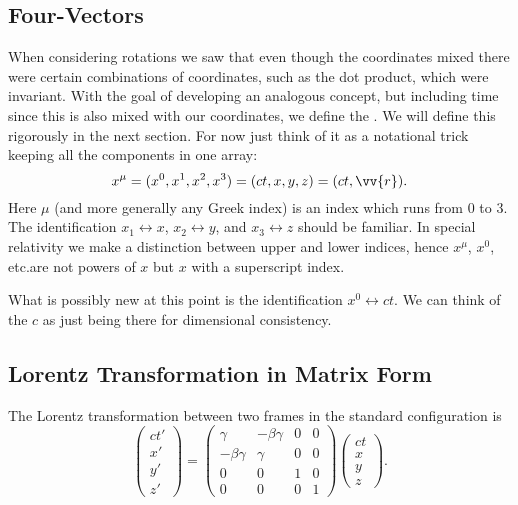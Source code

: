 \documentclass[fleqn]{NotesClass}
\begin{document}
    \subsection{Four-Vectors}
    When considering rotations we saw that even though the coordinates mixed there were certain combinations of coordinates, such as the dot product, which were invariant.
    With the goal of developing an analogous concept, but including time since this is also mixed with our coordinates, we define the .
    We will define this rigorously in the next section.
    For now just think of it as a notational trick keeping all the components in one array:
    \begin{equation}
        x^\mu = (x^0, x^1, x^2, x^3) = (ct, x, y, z) = (ct, \vv{r}).
    \end{equation}
    Here \(\mu\) (and more generally any Greek index) is an index which runs from \(0\) to \(3\).
    The identification \(x_1 \leftrightarrow x\), \(x_2 \leftrightarrow y\), and \(x_3 \leftrightarrow z\) should be familiar.
    In special relativity we make a distinction between upper and lower indices, hence \(x^\mu\), \(x^0\), etc.\@ are not powers of \(x\) but \(x\) with a superscript index.
    
    What is possibly new at this point is the identification \(x^0 \leftrightarrow ct\).
    We can think of the \(c\) as just being there for dimensional consistency.
    
    \subsection{Lorentz Transformation in Matrix Form}
    The Lorentz transformation between two frames in the standard configuration is
    \begin{equation}
        \begin{pmatrix}
            ct'\\ x'\\ y'\\ z'
        \end{pmatrix}
        =
        \begin{pmatrix}
            \gamma & -\beta\gamma & 0 & 0\\
            -\beta\gamma & \gamma & 0 & 0\\
            0 & 0 & 1 & 0\\
            0 & 0 & 0 & 1
        \end{pmatrix}
        \begin{pmatrix}
            ct\\ x\\ y\\ z
        \end{pmatrix}
        .
    \end{equation}
    
\end{document}
